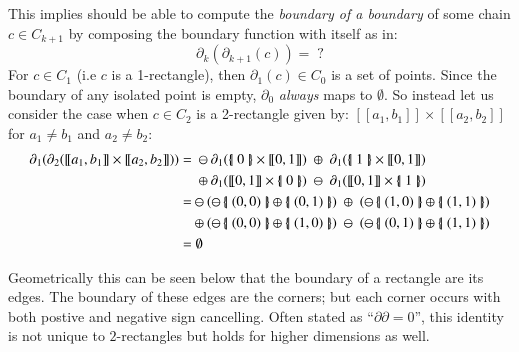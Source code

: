 This implies should be able to compute the \emph{boundary of a boundary} of some chain $c \in C_{k+1}$
by composing the boundary function with itself as in:
\begin{equation*}
	\partial_k ( \partial_{k+1} (c)) =\; ?
\end{equation*}
For $c \in C_1$ (i.e $c$ is a 1-rectangle), then $\partial_1(c) \in C_0$ is a set of points.
Since the boundary of any isolated point is empty, $\partial_0$ \emph{always} maps to $\emptyset$. 
So instead let us consider the case when $c \in C_2$ is a 2-rectangle given by: $[\![ a_1 , b_1 ]\!] \times [\![a_2, b_2 ]\!]$
for $a_1 \neq b_1$ and $a_2 \neq b_2$:
\begin{align*}
	\partial_1 ( \partial_2 ( [\![ a_1 , b_1 ]\!] \times [\![a_2, b_2 ]\!] ) )
	=	& 	\; \ominus 	\partial_1( \hset{0} \times [\![0,1]\!]) 
			\; \oplus \; 	\partial_1(\hset{1} \times [\![0,1]\!]) \notag \\
		& 	\; \oplus 	\partial_1( [\![0,1]\!] \times \hset{0}) 
			\; \ominus \; \partial_1([\![0,1]\!] \times \hset{1}) \\
	=	& 	\ominus	( 	\ominus \hset{(0,0)} \oplus \hset{(0,1)} ) 
			\;\oplus\;(	\ominus \hset{(1,0)} \oplus \hset{(1,1)}) \notag \\
		& 	\oplus ( 		\ominus \hset{(0,0)} \oplus \hset{(1,0)} ) 
			\;\ominus\;(	\ominus \hset{(0,1)} \oplus \hset{(1,1)}) \\
	=	& \;\emptyset	
\end{align*}

Geometrically this can be seen below that the boundary of a rectangle are its edges.
The boundary of these edges are the corners; but each corner occurs with both postive and negative sign cancelling.
Often stated as ``$\partial \partial = 0$'', this identity is not unique to $2$-rectangles but holds for higher dimensions as well.



